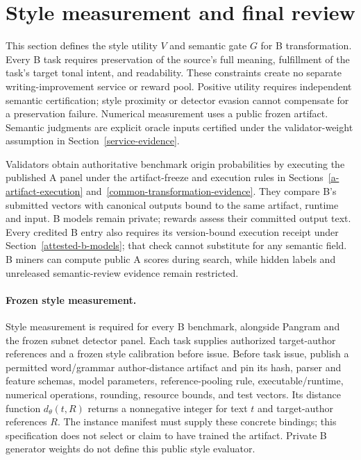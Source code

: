 \section{Style measurement and final review}\label{reward-adjudication}

This section defines the style utility \(V\) and semantic gate \(G\)
for B transformation. Every B task requires preservation of the source's
full meaning, fulfillment of the task's target tonal intent, and
readability. These constraints
create no separate writing-improvement service or reward pool. Positive
utility requires independent semantic certification; style proximity or
detector evasion cannot compensate for a preservation failure.
Numerical measurement uses a public frozen artifact.
Semantic judgments are explicit oracle inputs certified under the
validator-weight assumption in Section~\ref{service-evidence}.

Validators obtain authoritative benchmark origin probabilities by
executing the published A panel under the artifact-freeze and execution
rules in Sections~\ref{a-artifact-execution}
and~\ref{common-transformation-evidence}. They
compare B's submitted vectors with canonical outputs bound to the same
artifact, runtime and input. B models remain private; rewards assess
their committed output text. Every credited B entry also requires
its version-bound execution receipt under Section~\ref{attested-b-models};
that check cannot substitute for any semantic field. B miners can compute public A scores during
search, while hidden labels and unreleased semantic-review evidence
remain restricted.

\paragraph{Frozen style measurement.}
Style measurement is required for every B benchmark, alongside Pangram
and the frozen subnet detector panel. Each task supplies authorized
target-author references and a frozen style calibration before issue.
Before task issue, publish a permitted word/grammar author-distance
artifact and pin its hash, parser and feature schemas, model parameters,
reference-pooling rule, executable/runtime, numerical operations,
rounding, resource bounds, and test vectors. Its distance function
\(d_\theta(t,R)\) returns a nonnegative integer for text \(t\) and
target-author references \(R\). The instance manifest must supply these
concrete bindings; this specification does not select or claim to have
trained the artifact. Private B generator weights do not define this
public style evaluator.

